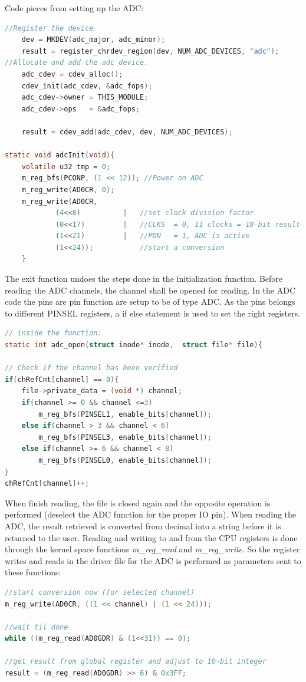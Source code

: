 Code pieces from setting up the ADC:

\begin{lstlisting}[language=c]
//Register the device
	dev = MKDEV(adc_major, adc_minor);
	result = register_chrdev_region(dev, NUM_ADC_DEVICES, "adc");
//Allocate and add the adc device.
	adc_cdev = cdev_alloc();
	cdev_init(adc_cdev, &adc_fops);
	adc_cdev->owner = THIS_MODULE;
	adc_cdev->ops   = &adc_fops;

	result = cdev_add(adc_cdev, dev, NUM_ADC_DEVICES);
	
static void adcInit(void){
	volatile u32 tmp = 0;
	m_reg_bfs(PCONP, (1 << 12)); //Power on ADC
	m_reg_write(AD0CR, 0);
	m_reg_write(AD0CR,
			(4<<8)			|	//set clock division factor
			(0<<17)			|	//CLKS  = 0, 11 clocks = 10-bit result
			(1<<21)			|	//PDN   = 1, ADC is active
			(1<<24));			//start a conversion
	}
\end{lstlisting}
The exit function undoes the steps done in the initialization function.
\p Before reading the ADC channels, the channel shall be opened for reading. In the ADC code the pins are pin function are setup to be of type ADC. As the pins belongs to different PINSEL registers, a if else statement is used to set the right registers.
\begin{lstlisting}[language=c]
// inside the function: 
static int adc_open(struct inode* inode,  struct file* file){

// Check if the channel has been verified
if(chRefCnt[channel] == 0){
	file->private_data = (void *) channel;
	if(channel >= 0 && channel <=3)
		m_reg_bfs(PINSEL1, enable_bits[channel]);
	else if(channel > 3 && channel < 6)
		m_reg_bfs(PINSEL3, enable_bits[channel]);
	else if(channel >= 6 && channel < 8)
		m_reg_bfs(PINSEL0, enable_bits[channel]);
}
chRefCnt[channel]++;
\end{lstlisting}
When finish reading, the file is closed again and the opposite operation is performed (deselect the ADC function for the proper IO pin).
\p When reading the ADC, the result retrieved is converted from decimal into a string before it is returned to the user. Reading and writing to and from the CPU registers is done through the kernel space functions \textit{m\_reg\_read} and \textit{m\_reg\_write}. So the register writes and reads in the driver file for the ADC is performed as parameters sent to these functions:
\begin{lstlisting}[language=c]
//start conversion now (for selected channel)
m_reg_write(AD0CR, ((1 << channel) | (1 << 24)));

//wait til done
while ((m_reg_read(AD0GDR) & (1<<31)) == 0);

//get result from global register and adjust to 10-bit integer
result = (m_reg_read(AD0GDR) >> 6) & 0x3FF;
\end{lstlisting}

